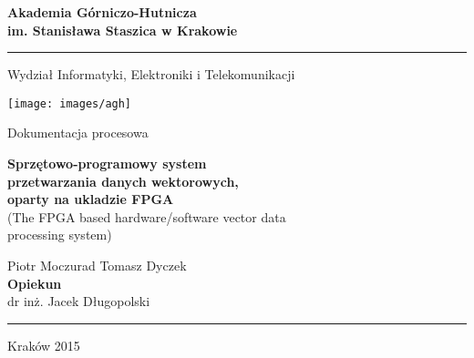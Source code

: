 \begin{titlepage}
    \begin{center}
		\fontsize{17pt}{20pt}\selectfont
        \textbf{Akademia Górniczo-Hutnicza\\im. Stanisława Staszica w Krakowie}
        \rule{\textwidth}{1.5pt}\par
        \vspace{0.5cm}
        Wydział Informatyki, Elektroniki i Telekomunikacji
        
        \vspace{1.5cm}

        \texttt{[image: images/agh]}

 		Dokumentacja procesowa
 		
 		\vspace{0.5cm}
	 	\textbf{Sprzętowo-programowy system\\przetwarzania danych wektorowych,\\oparty na ukladzie FPGA}\\
		(The FPGA based hardware/software vector data\\ processing system)
		
		\vspace{0.5cm}

		Piotr Moczurad \hspace{2cm}
		Tomasz Dyczek
		\vspace{0.5cm}\\
		\textbf{Opiekun}\\
		dr inż. Jacek Długopolski
		\rule{\textwidth}{1.5pt}\par
		Kraków 2015
		
        
    \end{center}
\end{titlepage}